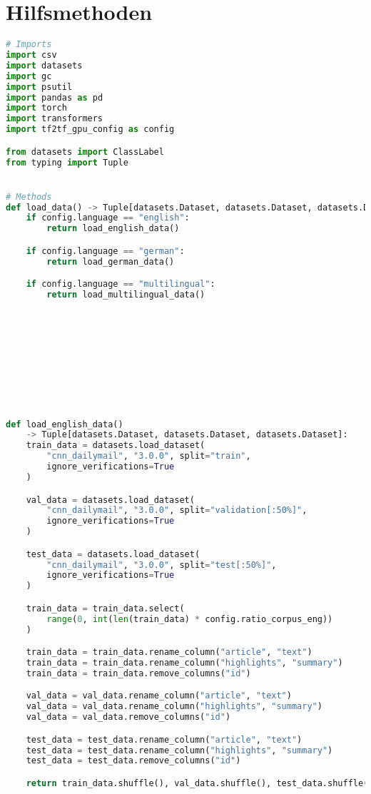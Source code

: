\section*{Hilfsmethoden}
\begin{lstlisting}[language=Python, caption=Hilfsmethoden]
# Imports
import csv
import datasets
import gc
import psutil
import pandas as pd
import torch
import transformers
import tf2tf_gpu_config as config

from datasets import ClassLabel
from typing import Tuple


# Methods
def load_data() -> Tuple[datasets.Dataset, datasets.Dataset, datasets.Dataset]:
    if config.language == "english":
        return load_english_data()

    if config.language == "german":
        return load_german_data()

    if config.language == "multilingual":
        return load_multilingual_data()










def load_english_data()
	-> Tuple[datasets.Dataset, datasets.Dataset, datasets.Dataset]:
    train_data = datasets.load_dataset(
        "cnn_dailymail", "3.0.0", split="train",
        ignore_verifications=True
    )

    val_data = datasets.load_dataset(
        "cnn_dailymail", "3.0.0", split="validation[:50%]",
        ignore_verifications=True
    )

    test_data = datasets.load_dataset(
        "cnn_dailymail", "3.0.0", split="test[:50%]",
        ignore_verifications=True
    )

    train_data = train_data.select(
        range(0, int(len(train_data) * config.ratio_corpus_eng))
    )

    train_data = train_data.rename_column("article", "text")
    train_data = train_data.rename_column("highlights", "summary")
    train_data = train_data.remove_columns("id")

    val_data = val_data.rename_column("article", "text")
    val_data = val_data.rename_column("highlights", "summary")
    val_data = val_data.remove_columns("id")

    test_data = test_data.rename_column("article", "text")
    test_data = test_data.rename_column("highlights", "summary")
    test_data = test_data.remove_columns("id")

    return train_data.shuffle(), val_data.shuffle(), test_data.shuffle()



\end{lstlisting}
